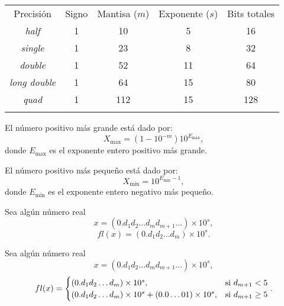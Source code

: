 \documentclass[8pt,a4paper]{extarticle}
\begin{document}
\begin{multicols}{3}
	\begin{center}
		\begin{tabular}{| c || c | c | c || c |}
			\hhline{-||---||-}
			Precisión          & Signo & Mantisa ($m$) & Exponente ($s$) & Bits totales \\
			\hhline{=::===::=}
			\emph{half}        & 1     & 10            & 5               & 16           \\
			\emph{single}      & 1     & 23            & 8               & 32           \\
			\emph{double}      & 1     & 52            & 11              & 64           \\
			\emph{long double} & 1     & 64            & 15              & 80           \\
			\emph{quad}        & 1     & 112           & 15              & 128          \\
			\hhline{-||---||-}
		\end{tabular}
	\end{center}

	\begin{boxprop}[]
		El número positivo más grande está dado por:
		\[
			X_{\max} = \left( 1 - 10^{-m} \right) 10^{E_{\max}}
			,\]
		donde $E_{\max}$ es el exponente entero positivo más grande.
	\end{boxprop}

	\begin{boxprop}[]
		El número positivo más pequeño está dado por:
		\[
			X_{\min} = 10^{E_{\min} - 1}
			,\]
		donde $E_{\min}$ es el exponente entero negativo más pequeño.
	\end{boxprop}

	\sectionbreak

	\begin{boxdef}
		Sea algún número real \[x = (0.d_1 d_2 \ldots d_m d_{m + 1} \ldots) \times 10^s,\]
		\[
			fl(x)= (0.d_1 d_2 \ldots d_m) \times 10^s
			.\]
	\end{boxdef}

	\begin{boxdef}
		Sea algún número real
		\[x = (0.d_1 d_2 \ldots d_m d_{m + 1} \ldots) \times 10^s,\]
		\[
			fl(x) = \begin{cases}
				(0.d_1 d_2 \ldots d_m) \times 10^s,                              & \text{\normalfont si } d_{m+1} < 5   \\
				(0.d_1 d_2 \ldots d_m) \times 10^s + (0.0 \ldots 01)\times 10^s, & \text{\normalfont si } d_{m+1} \ge 5
			\end{cases}
			.\]
	\end{boxdef}


\end{multicols}
\end{document}
